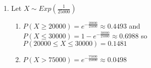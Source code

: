 \documentclass[12pt, a4paper]{article}
\begin{document}
\begin{enumerate}[Q\arabic*.]
\begin{enumerate}[(\roman*)]
    \end{enumerate}

  \item Let $X \sim Exp(\frac{1}{25000})$ 
    \begin{enumerate}[(\roman*)]
      \item $P(X \geq 20000) = e^{-\frac{20000}{25000}} \approx 0.4493$ and $P(X \leq 30000) = 1 - e^{-\frac{30000}{25000}} \approx 0.6988$ so $P(20000 \leq X \leq 30000) = 0.1481$

      \item $P(X > 75000) = e^{-\frac{75000}{25000}} \approx  0.0498$ 
    \end{enumerate}


\end{enumerate}
\end{document}
